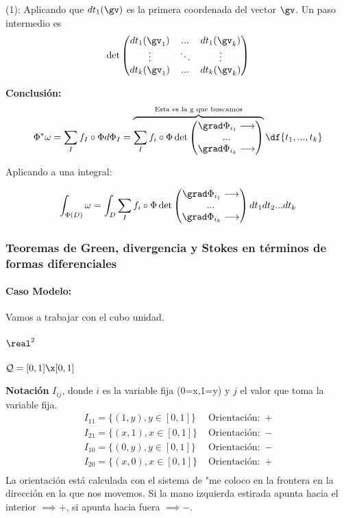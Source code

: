 (1): Aplicando que $dt_1(\gv)$ es la primera coordenada del vector $\gv$. Un paso intermedio es \[\det \begin{pmatrix}
dt_1(\gv_1) & ... & dt_1(\gv_k)\\
\vdots & \ddots & \vdots\\
dt_k(\gv_1) & ... & dt_k(\gv_k)
\end{pmatrix}\]

\textbf{Conclusión:}
\[
\Phi^{\ast} \omega = \sum_I f_I\circ\Phi d\Phi_I =
\overbrace{\sum_I f_i\circ\Phi 
\det\begin{pmatrix}
\grad \Phi_{i_1} \longrightarrow \\
...\\
\grad \Phi_{i_k} \longrightarrow 
\end{pmatrix}}^{\text{Esta es la g que buscamos}} \df{t_1,...,t_k}
\]

Aplicando a una integral:

\[\int_{\Phi(D)} \omega = \int_D \sum_I f_i\circ\Phi 
\det\begin{pmatrix}
\grad \Phi_{i_1} \longrightarrow \\
...\\
\grad \Phi_{i_k} \longrightarrow 
\end{pmatrix}dt_1dt_2...dt_k\]


\subsubsection{Teoremas de Green, divergencia y Stokes en términos de formas diferenciales}
\paragraph{Caso Modelo:}

Vamos a trabajar con el cubo unidad.

\subparagraph{$\real^2$} $\mathcal{Q} = [0,1]\x[0,1]$

\textbf{Notación} $I_{ij}$, donde $i$ es la variable fija (0=x,1=y) y $j$ el valor que toma la variable fija.
\[\begin{array}{cc}
I_{11} =\{(1,y),y\in[0,1]\}&\text{ Orientación: }\, +\\
I_{21} =\{(x,1),x\in[0,1]\}&\text{ Orientación: }\, -\\
I_{10} =\{(0,y),y\in[0,1]\}&\text{ Orientación: }\, -\\
I_{20} =\{(x,0),x\in[0,1]\}&\text{ Orientación: }\, +\\
\end{array}
\]
La orientación está calculada con el sistema de "me coloco en la frontera en la dirección en la que nos movemos. Si la mano izquierda estirada apunta hacia el interior $\implies +$, si apunta hacia fuera $\implies -$.

